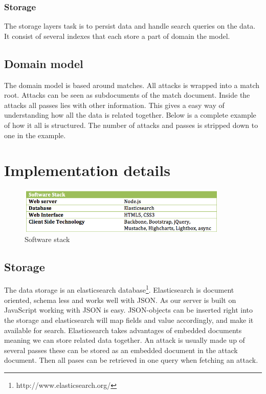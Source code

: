 \subsubsection{Storage}

The storage layers task is to persist data and handle search queries on the data. It consist of several indexes that each store a part of domain the model. 

\subsection{Domain model}

The domain model is based around matches. All attacks is wrapped into a match root. Attacks can be seen as subdocuments of the match document. Inside the attacks all passes lies with other information. This gives a easy way of understanding how all the data is related together. Below is a complete example of how it all is structured. The number of attacks and passes is stripped down to one in the example.



\section{Implementation details}

\begin{figure}[ht!]
\centering
\includegraphics[width=100mm]{images/implementation/software_stack.png}
\caption{Software stack}
\label{overflow}
\end{figure}

\subsection{Storage}

The data storage is an elasticsearch database\footnote{http://www.elasticsearch.org/}. Elasticsearch is document oriented, schema less and works well with JSON\footnotemark. As our server is built on JavaScript working with JSON is easy. JSON-objects can be inserted right into the storage and elasticsearch will map fields and value accordingly, and make it available for search.
Elasticsearch takes advantages of embedded documents meaning we can store related data together. An attack is usually made up of several passes these can be stored as an embedded document in the attack document. Then all pases can be retrieved in one query when fetching an attack.

